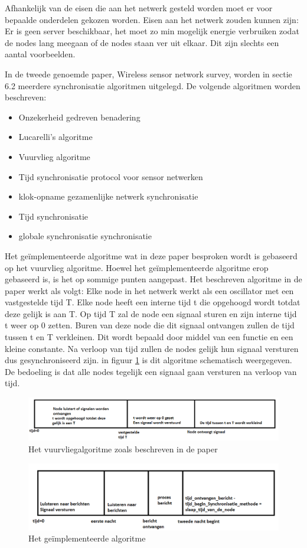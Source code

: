 \documentclass{article}
\begin{document}
Afhankelijk van de eisen die aan het netwerk gesteld worden moet er voor bepaalde onderdelen gekozen worden. Eisen aan het netwerk zouden kunnen zijn: Er is geen server beschikbaar, het moet zo min mogelijk energie verbruiken zodat de nodes lang meegaan of de nodes staan ver uit elkaar. Dit zijn slechts een aantal voorbeelden. 

In de tweede genoemde paper, Wireless sensor network survey, worden in sectie 6.2 meerdere synchronisatie algoritmen uitgelegd. De volgende algoritmen worden beschreven:
\begin{itemize}
	\item Onzekerheid gedreven benadering
	\item Lucarelli's algoritme
	\item Vuurvlieg algoritme
	\item Tijd synchronisatie protocol voor sensor netwerken
	\item klok-opname gezamenlijke netwerk synchronisatie
	\item Tijd synchronisatie
	\item globale synchronisatie
	synchronisatie 
\end{itemize}

Het ge\"{i}mplementeerde algoritme wat in deze paper besproken wordt is gebaseerd op het vuurvlieg algoritme. Hoewel het ge\"{i}mplementeerde algoritme erop gebaseerd is, is het op sommige punten aangepast. 
Het beschreven algoritme in de paper werkt als volgt: 
Elke node in het netwerk werkt als een oscillator met een vastgestelde tijd T. Elke node heeft een interne tijd t die opgehoogd wordt totdat deze gelijk is aan T. Op tijd T zal de node een signaal sturen en zijn interne tijd t weer op 0 zetten. Buren van deze node die dit signaal ontvangen zullen de tijd tussen t en T verkleinen. Dit wordt bepaald door middel van een functie en een kleine constante. Na verloop van tijd zullen de nodes gelijk hun signaal versturen dus gesynchroniseerd zijn. in figuur \ref{fig: Firefly} is dit algoritme schematisch weergegeven. De bedoeling is dat alle nodes tegelijk een signaal gaan versturen na verloop van tijd.  
\begin{figure}[h]
\centering\includegraphics[scale=0.5]{Firefly}
\caption{Het vuurvliegalgoritme zoals beschreven in de paper}
\label{fig: Firefly}
\end{figure}
\begin{figure}[h]
\centering\includegraphics[scale=0.5]{Onze_implementatie}
\caption{Het ge\"{i}mplementeerde algoritme}
\label{fig: Onze_implementatie}
\end{figure}
\end{document}
